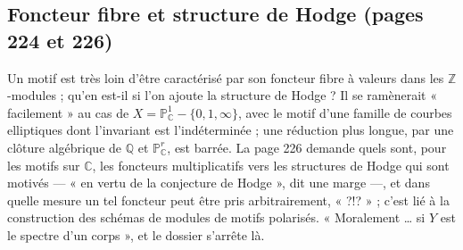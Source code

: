 \documentclass[11pt,a4paper]{article}
\begin{document}
\subsection*{Foncteur fibre et structure de Hodge (pages 224 et 226)}

Un motif est très loin d'être caractérisé par son foncteur fibre à valeurs dans
les $\mathbb{Z}$-modules ; qu'en est-il si l'on ajoute la structure de Hodge ?
Il se ramènerait « facilement » au cas de $X = \mathbb{P}^{1}_{\mathbb{C}} -
\{0, 1, \infty\}$, avec le motif d'une famille de courbes elliptiques dont
l'invariant est l'indéterminée ; une réduction plus longue, par une clôture
algébrique de $\mathbb{Q}$ et $\mathbb{P}^{r}_{\mathbb{C}}$, est barrée. La page
226 demande quels sont, pour les motifs sur $\mathbb{C}$, les foncteurs
multiplicatifs vers les structures de Hodge qui sont motivés --- « en vertu de
la conjecture de Hodge », dit une marge ---, et dans quelle mesure un tel
foncteur peut être pris arbitrairement, « ?!? » ; c'est lié à la construction
des schémas de modules de motifs polarisés. « Moralement … si $Y$ est le
spectre d'un corps », et le dossier s'arrête là.
\end{document}
